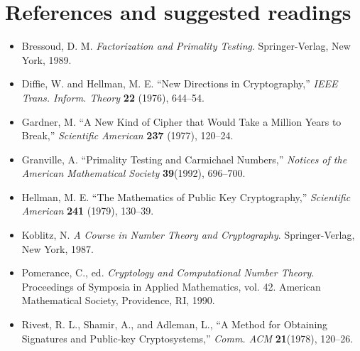 \section{References and suggested readings}
\label{sec:Cryptography:References}
 
{\small
\begin{itemize}
 
\item[{\bf [1]}]
Bressoud, D. M. {\it Factorization and Primality Testing}.
Springer-Verlag, New York, 1989. 
 
\item[{\bf [2]}]
Diffie, W. and Hellman, M. E. ``New Directions in
Cryptography,'' {\it IEEE Trans. Inform. Theory} {\bf
22} (1976), 644--54.
 
\item[{\bf [3]}]
Gardner, M. ``A New Kind of Cipher that Would Take a Million
Years to Break,'' {\it Scientific American} {\bf
237} (1977), 120--24.
 
\item[{\bf [4]}]%
Granville, A. ``Primality Testing and Carmichael Numbers,'' {\it
Notices of the American Mathematical Society} {\bf 39}(1992),
696--700. 
 
 
 
\item[{\bf [5]}]
Hellman, M. E. ``The Mathematics of Public Key
Cryptography,''  {\it Scientific American} {\bf 241}
(1979), 130--39.
 
\item[{\bf [6]}]%
Koblitz, N. {\it A Course in Number Theory and Cryptography}.
Springer-Verlag, New York, 1987. 
 
 
\item[{\bf [7]}]
Pomerance, C., ed. {\it Cryptology and Computational Number
Theory}. Proceedings of Symposia in Applied Mathematics,
vol. 42. American Mathematical Society, Providence, RI,
1990.
 
 
\item[{\bf [8]}]
Rivest, R. L., Shamir, A., and Adleman, L., ``A Method for
Obtaining Signatures and Public-key Cryptosystems,'' {\it
Comm. ACM} {\bf 21}(1978), 120--26.
 
\end{itemize}
}
 
 
 

